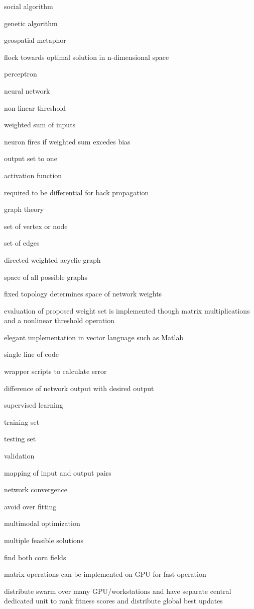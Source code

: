 \documentclass[8pt,journal,compsoc]{IEEEtran}
\begin{document}
social algorithm 

genetic algorithm 

geospatial metaphor 

flock towards optimal solution in n-dimensional space

perceptron

neural network 

non-linear threshold

weighted sum of inputs 

neuron fires if weighted sum excedes bias 

output set to one

activation function 

required to be differential for back propagation 

graph theory 

set of vertex or node 

set of edges 

directed weighted acyclic graph 

space of all possible graphs

fixed topology determines space of network weights

evaluation of proposed weight set is implemented though matrix multiplications and a nonlinear threshold operation 

elegant implementation in vector language such as Matlab

single line of code 

wrapper scripts to calculate error 

difference of network output with desired output 

supervised learning 

training set

testing set

validation 

mapping of input and output pairs 

network convergence

avoid over fitting 

multimodal optimization 

multiple feasible solutions 

find both corn fields 

matrix operations can be implemented on GPU for fast operation 

distribute swarm over many GPU/workstations and have separate central dedicated unit to rank fitness scores and distribute global best updates 
\end{document}
